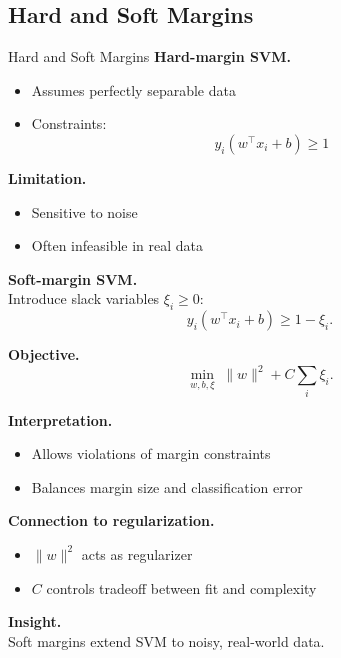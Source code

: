 \documentclass[aspectratio=169,11pt]{beamer}
\begin{document}
\subsection{Hard and Soft Margins}
\begin{frame}[t,allowframebreaks]{Hard and Soft Margins}
\small
\textbf{Hard-margin SVM.}\\ \begin{itemize}
    \item Assumes perfectly separable data
    \item Constraints:
    \[
    y_i(w^\top x_i + b) \geq 1
    \]
\end{itemize}

\textbf{Limitation.}\\ \begin{itemize}
    \item Sensitive to noise
    \item Often infeasible in real data
\end{itemize}

\textbf{Soft-margin SVM.}\\ Introduce slack variables $\xi_i \geq 0$:
\[
y_i(w^\top x_i + b) \geq 1 - \xi_i.
\]

\textbf{Objective.}\\ \[
\min_{w,b,\xi} \; \|w\|^2 + C \sum_i \xi_i.
\]

\textbf{Interpretation.}\\ \begin{itemize}
    \item Allows violations of margin constraints
    \item Balances margin size and classification error
\end{itemize}

\textbf{Connection to regularization.}\\ \begin{itemize}
    \item $\|w\|^2$ acts as regularizer
    \item $C$ controls tradeoff between fit and complexity
\end{itemize}

\textbf{Insight.}\\ Soft margins extend SVM to noisy, real-world data.
\end{frame}
\end{document}
